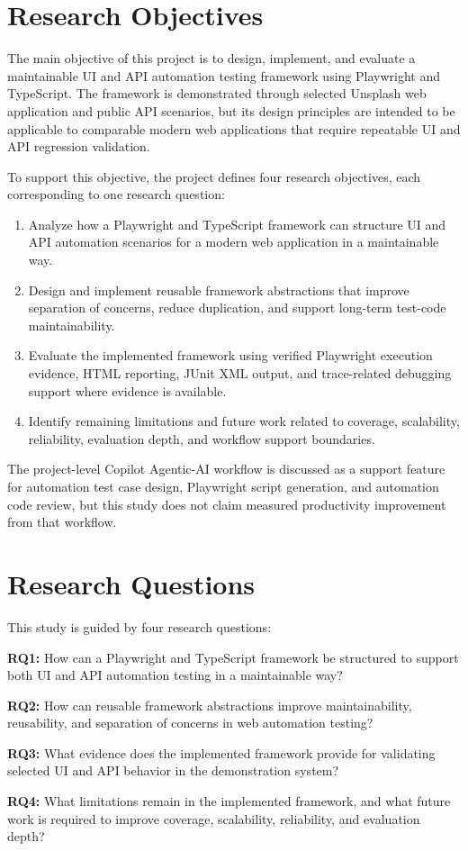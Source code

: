 \section{Research Objectives}
\label{sec:ch1-research-objectives}

The main objective of this project is to design, implement, and evaluate a maintainable UI and API automation testing framework using Playwright and TypeScript. The framework is demonstrated through selected Unsplash web application and public API scenarios, but its design principles are intended to be applicable to comparable modern web applications that require repeatable UI and API regression validation.

To support this objective, the project defines four research objectives, each corresponding to one research question:

\begin{enumerate}
  \item Analyze how a Playwright and TypeScript framework can structure UI and API automation scenarios for a modern web application in a maintainable way.
  \item Design and implement reusable framework abstractions that improve separation of concerns, reduce duplication, and support long-term test-code maintainability.
  \item Evaluate the implemented framework using verified Playwright execution evidence, HTML reporting, JUnit XML output, and trace-related debugging support where evidence is available.
  \item Identify remaining limitations and future work related to coverage, scalability, reliability, evaluation depth, and workflow support boundaries.
\end{enumerate}

The project-level Copilot Agentic-AI workflow is discussed as a support feature for automation test case design, Playwright script generation, and automation code review, but this study does not claim measured productivity improvement from that workflow.

\section{Research Questions}
\label{sec:ch1-research-questions}

This study is guided by four research questions:

\noindent\textbf{RQ1:} How can a Playwright and TypeScript framework be structured to support both UI and API automation testing in a maintainable way?

\noindent\textbf{RQ2:} How can reusable framework abstractions improve maintainability, reusability, and separation of concerns in web automation testing?

\noindent\textbf{RQ3:} What evidence does the implemented framework provide for validating selected UI and API behavior in the demonstration system?

\noindent\textbf{RQ4:} What limitations remain in the implemented framework, and what future work is required to improve coverage, scalability, reliability, and evaluation depth?

